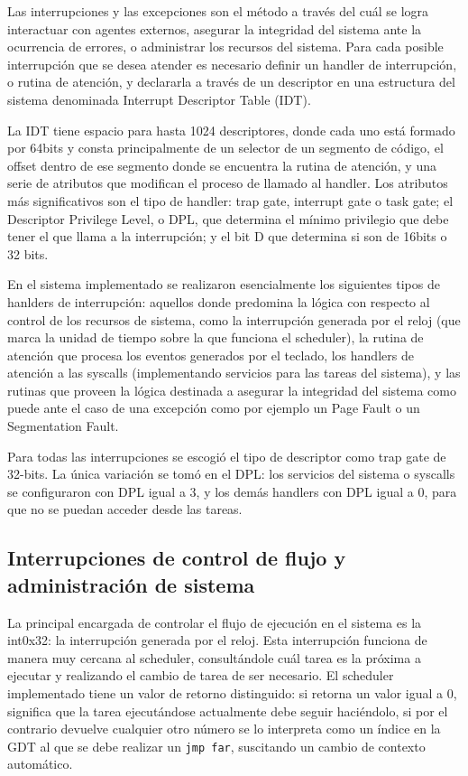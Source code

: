 	Las interrupciones y las excepciones son el método a través del cuál 
se logra interactuar con agentes externos, asegurar la integridad del sistema 
ante la ocurrencia de errores, o administrar los recursos del sistema. Para cada 
posible interrupción que se desea atender es necesario definir un handler de 
interrupción, o rutina de atención, y declararla a través de un descriptor
en una estructura del sistema denominada Interrupt Descriptor Table (IDT).

	La IDT tiene espacio para hasta 1024 descriptores, donde cada uno está formado 
por 64bits y consta principalmente de un selector de un segmento de código, el offset 
dentro de ese segmento donde se encuentra la rutina de atención, y una serie de atributos 
que modifican el proceso de llamado al handler. Los atributos más significativos son 
el tipo de handler: trap gate, interrupt gate o task gate; el Descriptor Privilege Level,
o DPL, que determina el mínimo privilegio que debe tener el que llama a la interrupción; y 
el bit D que determina si son de 16bits o 32 bits.

	En el sistema implementado se realizaron esencialmente los siguientes tipos de 
hanlders de interrupción: aquellos donde predomina la lógica con respecto 
al control de los recursos de sistema, como la interrupción generada por el reloj 
(que marca la unidad de tiempo sobre la que funciona el scheduler), la rutina de atención 
que procesa los eventos generados por el teclado, los handlers de atención a las syscalls 
(implementando servicios para las tareas del sistema), y las rutinas que proveen la lógica 
destinada a asegurar la integridad del sistema como puede ante el caso de una excepción 
como por ejemplo un Page Fault o un Segmentation Fault.
	
	Para todas las interrupciones se escogió el tipo de descriptor como trap gate de 32-bits. 
La única variación se tomó en el DPL: los servicios del sistema o syscalls se configuraron con DPL igual a 3, y los demás handlers con DPL igual a 0, para que no se puedan acceder desde las tareas.

\subsection{Interrupciones de control de flujo y administración de sistema}

	
	La principal encargada de controlar el flujo de ejecución en el sistema es la int0x32: 
la interrupción generada por el reloj. Esta interrupción funciona de manera muy cercana 
al scheduler, consultándole cuál tarea es la próxima a ejecutar y realizando el cambio 
de tarea de ser necesario. El scheduler implementado tiene un valor de retorno distinguido: 
si retorna un valor igual a 0, significa que la tarea ejecutándose actualmente debe seguir haciéndolo, 
si por el contrario devuelve cualquier otro número se lo interpreta como un índice en
la GDT al que se debe realizar un \texttt{jmp far}, suscitando un cambio de contexto 
automático.

